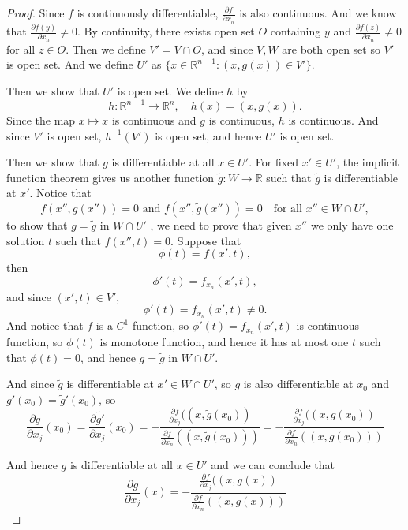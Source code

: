 \begin{proof}
    Since $f$ is continuously differentiable, $\frac{\partial f}{\partial x_n}$ is also continuous. And we know that $\frac{\partial f(y)}{\partial x_n} \neq 0$. By continuity, there exists open set $O$ containing $y$ and $\frac{\partial f(z)}{\partial x_n} \neq 0$ for all $z \in O$. Then we define $V' = V \cap O$, and since $V, W$ are both open set so $V'$ is open set. And we define $U'$ as $\{x \in \mathbb{R}^{n-1}: (x,g(x)) \in V'\}$. 
    
    Then we show that $U'$ is open set. We define $h$ by
    \[
        h : \mathbb{R}^{n-1} \to \mathbb{R}^n, \quad h(x) = (x, g(x)).
    \] Since the map $x \mapsto x$ is continuous and $g$ is continuous, $h$ is continuous. And since $V'$ is open set, $h^{-1}(V')$ is open set, and hence $U'$ is open set.


    Then we show that $g$ is differentiable at all $x \in U'$. For fixed $x' \in U'$, the implicit function theorem gives us another function $\tilde{g} : W \to \mathbb{R}$ such that $\tilde{g}$ is differentiable at $x'$. Notice that 
    \[
        f(x'', g(x'')) = 0 \text{ and } f(x'', \tilde{g}(x'')) = 0 \quad \text{for all } x'' \in W \cap U',
    \]
    to show that $g = \tilde{g}$ in $W \cap U'$ , we need to prove that given $x''$ we only have one solution $t$ such that $f(x'',t) = 0$. Suppose that 
    \[
        \phi(t) = f(x',t),
    \]
    then 
    \[
        \phi'(t) = f_{x_n}(x',t),
    \]
    and since $(x', t) \in V'$, 
    \[
        \phi'(t) = f_{x_n}(x',t) \neq 0.
    \]
    And notice that $f$ is a $C^1$ function, so $\phi'(t) = f_{x_n}(x', t)$ is continuous function, so $\phi(t)$ is monotone function, and hence it has at most one $t$ such that $\phi(t) = 0$, and hence $g = \tilde{g}$ in $W \cap U'$.
    
    And since $\tilde{g}$ is differentiable at $x' \in W \cap U'$, so $g$ is also differentiable at $x_0$ and $g'(x_0) = \tilde{g}'(x_0)$, so
    \[
        \frac{\partial g}{\partial x_j}(x_0) = \frac{\partial \tilde{g'}}{\partial x_j}(x_0) = -\frac{\frac{\partial f}{\partial x_j}((x, \tilde{g}(x_0))}{\frac{\partial f}{\partial x_n}((x,\tilde{g}(x_0)))} = -\frac{\frac{\partial f}{\partial x_j}((x, g(x_0))}{\frac{\partial f}{\partial x_n}((x,g(x_0)))}
    \]

    And hence $g$ is differentiable at all $x \in U'$ and we can conclude that 
    \[
        \frac{\partial g}{\partial x_j}(x) = -\frac{\frac{\partial f}{\partial x_j}((x, g(x))}{\frac{\partial f}{\partial x_n}((x,g(x)))}
    \]

    

    
\end{proof}

